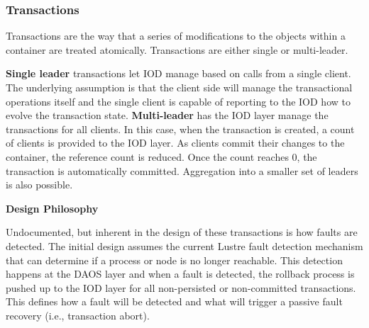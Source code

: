 \documentclass{sig-alt-gov2}
\begin{document}
\subsubsection{Transactions}
Transactions are the way that a series of modifications
to the objects within a container are treated atomically.
Transactions are either single or multi-leader.

\textbf{Single leader} transactions let IOD manage based on calls from
a single client. The underlying assumption is that the client side will manage
the transactional operations itself and the single client is capable of
reporting to the IOD how to evolve the transaction state. 
\textbf{Multi-leader} has the IOD layer manage the
transactions for all clients. In this case, when the transaction is created, a count of clients
is provided to the IOD layer. As clients commit their changes to the container,
the reference count is reduced. Once the count reaches 0, the transaction is
automatically committed. Aggregation into a smaller set of leaders is also
possible.

\noindent\textbf{Design Philosophy}

Undocumented, but inherent in the design of these transactions is how faults
are detected. The initial design assumes the current Lustre fault detection
mechanism that can determine if a process or node is no longer reachable. This
detection happens at the DAOS layer and when a fault is detected, the rollback
process is pushed up to the IOD layer for all non-persisted or non-committed
transactions. This defines how a fault will be detected and what will trigger a
passive fault recovery (i.e., transaction abort).
\end{document}
